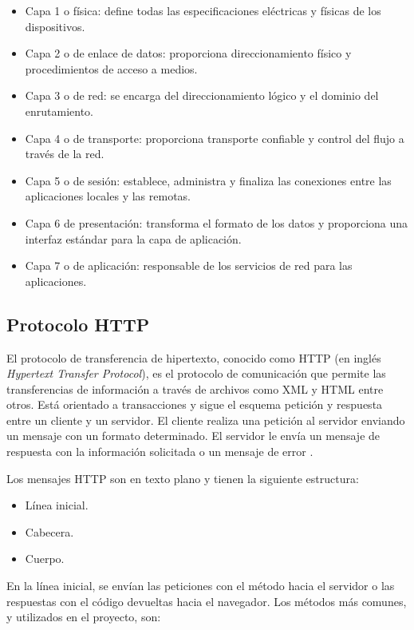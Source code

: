 \begin{itemize}
	\item Capa 1 o física: define todas las especificaciones eléctricas y físicas de los dispositivos.
	\item Capa 2 o de enlace de datos: proporciona direccionamiento físico y procedimientos de acceso a medios.
	\item Capa 3 o de red: se encarga del direccionamiento lógico y el dominio del enrutamiento.
	\item Capa 4 o de transporte: proporciona transporte confiable y control del flujo a través de la red.
	\item Capa 5 o de sesión: establece, administra y finaliza las conexiones entre las aplicaciones locales y las remotas.
	\item Capa 6 de presentación: transforma el formato de los datos y proporciona una interfaz estándar para la capa de aplicación.
	\item Capa 7 o de aplicación: responsable de los servicios de red para las aplicaciones.
\end{itemize}

\subsection{Protocolo HTTP}

El protocolo de transferencia de hipertexto, conocido como HTTP (en inglés \textit{Hypertext Transfer Protocol}), es el protocolo de comunicación que permite las transferencias de información a través de archivos como XML y HTML entre otros. Está orientado a transacciones y sigue el esquema petición y respuesta entre un cliente y un servidor. El cliente realiza una petición al servidor enviando un mensaje con un formato determinado. El servidor le envía un mensaje de respuesta con la información solicitada o un mensaje de error \citep{9}.

Los mensajes HTTP son en texto plano y tienen la siguiente estructura:

\begin{itemize}
	\item Línea inicial.
	\item Cabecera.
	\item Cuerpo.
\end{itemize}

En la línea inicial, se envían las peticiones con el método hacia el servidor o las respuestas con el código devueltas hacia el navegador. Los métodos más comunes, y utilizados en el proyecto, son:

